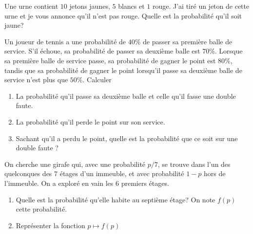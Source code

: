 \documentclass[a4paper,12pt,reqno]{amsart}
\begin{document}


\begin{exo}

  Une urne contient $10$ jetons jaunes, $5$ blancs et $1$ rouge. J'ai tiré un jeton de cette urne et je vous annonce qu'il n'est pas rouge. Quelle est la probabilité qu'il soit jaune?

\end{exo}

\begin{exo}

  Un joueur de tennis a une probabilité de $40\%$ de passer sa première balle de service. S'il échoue, sa probabilité de passer sa deuxième balle est $70\%$. Lorsque sa première balle de service passe, sa probabilité de gagner le point est $80\%$, tandis que sa probabilité de gagner le point lorsqu'il passe sa deuxième balle de service n'est plus que $50\%$. Calculer

  \begin{enumerate}
    \item La probabilité qu'il passe sa deuxième balle et celle qu'il fasse une double faute.
    \item La probabilité qu'il perde le point sur son service.
    \item Sachant qu'il a perdu le point, quelle est la probabilité que ce soit sur une double faute ?
  \end{enumerate}

\end{exo}

\begin{exo}

  On cherche une girafe qui, avec une probabilité $p/7$, se trouve dans l'un des quelconques des $7$ étages d'un immeuble, et avec probabilité $1-p$ hors de l'immeuble. On a exploré en vain les $6$ premiers étages.

  \begin{enumerate}
    \item Quelle est la probabilité qu'elle habite au  septième étage? On note $f(p)$ cette probabilité.
    \item Représenter  la fonction $p\mapsto f(p)$
  \end{enumerate}

\end{exo}
\end{document}

